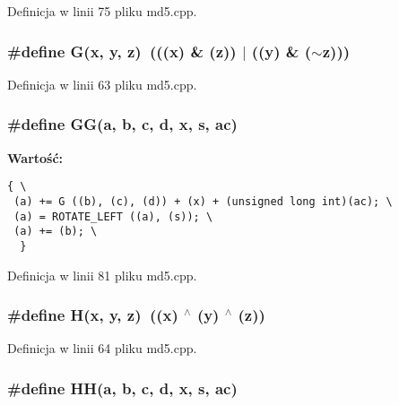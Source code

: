 Definicja w linii 75 pliku md5.cpp.\hypertarget{a00009_d96b7cf3182ce2ba85e5a7a93b12c441}{
\subsubsection[{G}]{\setlength{\rightskip}{0pt plus 5cm}\#define G(x, \/  y, \/  z)~(((x) \& (z)) $|$ ((y) \& ($\sim$z)))}}
\label{a00009_d96b7cf3182ce2ba85e5a7a93b12c441}




Definicja w linii 63 pliku md5.cpp.\hypertarget{a00009_685f32faa2a66e743850b990a13b8bfa}{
\subsubsection[{GG}]{\setlength{\rightskip}{0pt plus 5cm}\#define GG(a, \/  b, \/  c, \/  d, \/  x, \/  s, \/  ac)}}
\label{a00009_685f32faa2a66e743850b990a13b8bfa}


\textbf{Wartość:}

\begin{Code}\begin{verbatim}{ \
 (a) += G ((b), (c), (d)) + (x) + (unsigned long int)(ac); \
 (a) = ROTATE_LEFT ((a), (s)); \
 (a) += (b); \
  }
\end{verbatim}
\end{Code}


Definicja w linii 81 pliku md5.cpp.\hypertarget{a00009_e42219072d798876e6b08e6b78614ff6}{
\subsubsection[{H}]{\setlength{\rightskip}{0pt plus 5cm}\#define H(x, \/  y, \/  z)~((x) $^\wedge$ (y) $^\wedge$ (z))}}
\label{a00009_e42219072d798876e6b08e6b78614ff6}




Definicja w linii 64 pliku md5.cpp.\hypertarget{a00009_8b9f1c4778df01ef970b87dbe5541dc5}{
\subsubsection[{HH}]{\setlength{\rightskip}{0pt plus 5cm}\#define HH(a, \/  b, \/  c, \/  d, \/  x, \/  s, \/  ac)}}
\label{a00009_8b9f1c4778df01ef970b87dbe5541dc5}


